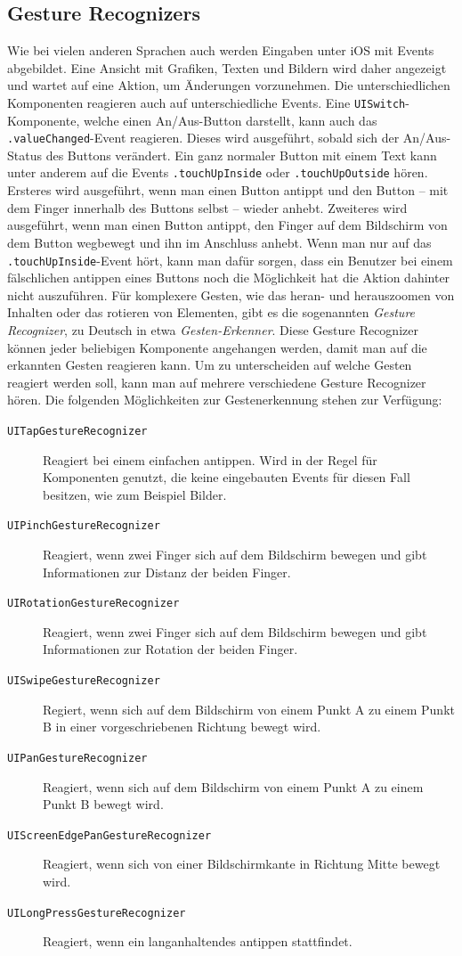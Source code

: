 \subsection{Gesture Recognizers}
\label{subsec:gesturerecognizer}
Wie bei vielen anderen Sprachen auch werden Eingaben unter iOS mit Events abgebildet.
Eine Ansicht mit Grafiken, Texten und Bildern wird daher angezeigt und wartet auf eine Aktion, um Änderungen vorzunehmen.
Die unterschiedlichen Komponenten reagieren auch auf unterschiedliche Events.
Eine \texttt{UISwitch}-Komponente, welche einen An/Aus-Button darstellt, kann auch das \texttt{.valueChanged}-Event reagieren.
Dieses wird ausgeführt, sobald sich der An/Aus-Status des Buttons verändert.
Ein ganz normaler Button mit einem Text kann unter anderem auf die Events \texttt{.touchUpInside} oder \texttt{.touchUpOutside} hören.
Ersteres wird ausgeführt, wenn man einen Button antippt und den Button – mit dem Finger innerhalb des Buttons selbst – wieder anhebt.
Zweiteres wird ausgeführt, wenn man einen Button antippt, den Finger auf dem Bildschirm von dem Button wegbewegt und ihn im Anschluss anhebt.
Wenn man nur auf das \texttt{.touchUpInside}-Event hört, kann man dafür sorgen, dass ein Benutzer bei einem fälschlichen antippen eines Buttons noch die Möglichkeit hat die Aktion dahinter nicht auszuführen.\pbreak%
%
Für komplexere Gesten, wie das heran- und herauszoomen von Inhalten oder das rotieren von Elementen, gibt es die sogenannten \emph{Gesture Recognizer}, zu Deutsch in etwa \emph{Gesten-Erkenner}.
Diese Gesture Recognizer können jeder beliebigen Komponente angehangen werden, damit man auf die erkannten Gesten reagieren kann.
Um zu unterscheiden auf welche Gesten reagiert werden soll, kann man auf mehrere verschiedene Gesture Recognizer hören.
Die folgenden Möglichkeiten zur Gestenerkennung stehen zur Verfügung:
\begin{description}
	\item[\texttt{UITapGestureRecognizer}] Reagiert bei einem einfachen antippen. Wird in der Regel für Komponenten genutzt, die keine eingebauten Events für diesen Fall besitzen, wie zum Beispiel Bilder.
	\item[\texttt{UIPinchGestureRecognizer}] Reagiert, wenn zwei Finger sich auf dem Bildschirm bewegen und gibt Informationen zur Distanz der beiden Finger.
	\item[\texttt{UIRotationGestureRecognizer}] Reagiert, wenn zwei Finger sich auf dem Bildschirm bewegen und gibt Informationen zur Rotation der beiden Finger.
	\item[\texttt{UISwipeGestureRecognizer}] Regiert, wenn sich auf dem Bildschirm von einem Punkt A zu einem Punkt B in einer vorgeschriebenen Richtung bewegt wird.
	\item[\texttt{UIPanGestureRecognizer}] Reagiert, wenn sich auf dem Bildschirm von einem Punkt A zu einem Punkt B bewegt wird.
	\item[\texttt{UIScreenEdgePanGestureRecognizer}] Reagiert, wenn sich von einer Bildschirmkante in Richtung Mitte bewegt wird.
	\item[\texttt{UILongPressGestureRecognizer}] Reagiert, wenn ein langanhaltendes antippen stattfindet.
\end{description}

